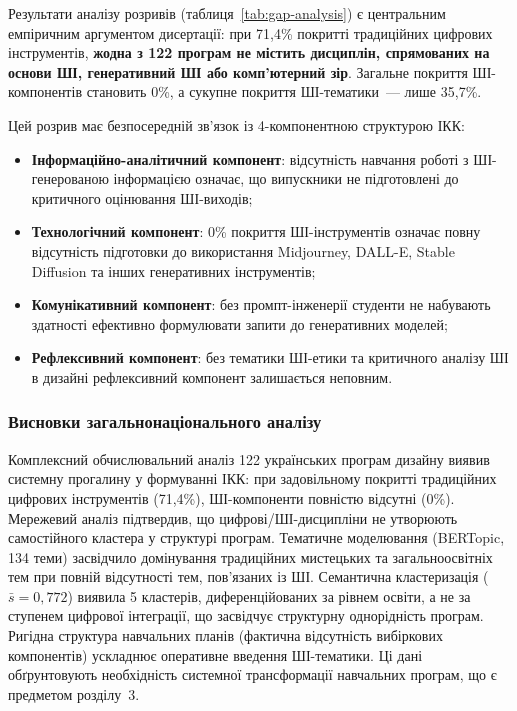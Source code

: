 Результати аналізу розривів (таблиця~\ref{tab:gap-analysis}) є центральним емпіричним аргументом дисертації: при 71,4\% покритті традиційних цифрових інструментів, \textbf{жодна з 122 програм не містить дисциплін, спрямованих на основи ШІ, генеративний ШІ або комп'ютерний зір}. Загальне покриття ШІ-компонентів становить 0\%, а сукупне покриття ШІ-тематики~--- лише 35,7\%.

Цей розрив має безпосередній зв'язок із 4-компонентною структурою ІКК:
\begin{itemize}
    \item \textbf{Інформаційно-аналітичний компонент}: відсутність навчання роботі з ШІ-генерованою інформацією означає, що випускники не підготовлені до критичного оцінювання ШІ-виходів;
    \item \textbf{Технологічний компонент}: 0\% покриття ШІ-інструментів означає повну відсутність підготовки до використання Midjourney, DALL-E, Stable Diffusion та інших генеративних інструментів;
    \item \textbf{Комунікативний компонент}: без промпт-інженерії студенти не набувають здатності ефективно формулювати запити до генеративних моделей;
    \item \textbf{Рефлексивний компонент}: без тематики ШІ-етики та критичного аналізу ШІ в дизайні рефлексивний компонент залишається неповним.
\end{itemize}

\subsubsection{Висновки загальнонаціонального аналізу}\label{sssec:2.1.6}

Комплексний обчислювальний аналіз 122 українських програм дизайну виявив системну прогалину у формуванні ІКК: при задовільному покритті традиційних цифрових інструментів (71,4\%), ШІ-компоненти повністю відсутні (0\%). Мережевий аналіз підтвердив, що цифрові/ШІ-дисципліни не утворюють самостійного кластера у структурі програм. Тематичне моделювання (BERTopic, 134 теми) засвідчило домінування традиційних мистецьких та загальноосвітніх тем при повній відсутності тем, пов'язаних із ШІ. Семантична кластеризація ($\bar{s} = 0{,}772$) виявила 5 кластерів, диференційованих за рівнем освіти, а не за ступенем цифрової інтеграції, що засвідчує структурну однорідність програм. Ригідна структура навчальних планів (фактична відсутність вибіркових компонентів) ускладнює оперативне введення ШІ-тематики. Ці дані обґрунтовують необхідність системної трансформації навчальних програм, що є предметом розділу~3.
